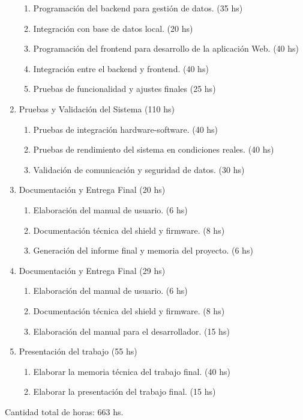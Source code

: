 \documentclass[
11pt, %
]{charter}
\begin{document}
\begin{enumerate}
\begin{enumerate}
	\item Programación del backend para gestión de datos. (35 hs)
	\item Integración con base de datos local. (20 hs)
	\item Programación del frontend para desarrollo de la aplicación Web. (40 hs)
	\item Integración entre el backend y frontend. (40 hs)
	\item Pruebas de funcionalidad y ajustes finales (25 hs)
	\end{enumerate}
\item Pruebas y Validación del Sistema (110 hs)
	\begin{enumerate}
	\item Pruebas de integración hardware-software. (40 hs)
	\item Pruebas de rendimiento del sistema en condiciones reales. (40 hs)
	\item Validación de comunicación y seguridad de datos. (30 hs)
	\end{enumerate}
\item Documentación y Entrega Final (20 hs)
	\begin{enumerate}
	\item Elaboración del manual de usuario. (6 hs)
	\item Documentación técnica del shield y firmware. (8 hs)
	\item Generación del informe final y memoria del proyecto. (6 hs)
	\end{enumerate}
\item Documentación y Entrega Final (29 hs)
	\begin{enumerate}
	\item Elaboración del manual de usuario. (6 hs)
	\item Documentación técnica del shield y firmware. (8 hs)
	\item Elaboración del manual para el desarrollador. (15 hs)
	\end{enumerate}
\item Presentación del trabajo (55 hs)
	\begin{enumerate}
	\item Elaborar la memoria técnica del trabajo final. (40 hs)
	\item Elaborar la presentación del trabajo final. (15 hs)
	\end{enumerate}
\end{enumerate}

Cantidad total de horas: 663 hs.
\end{document}
